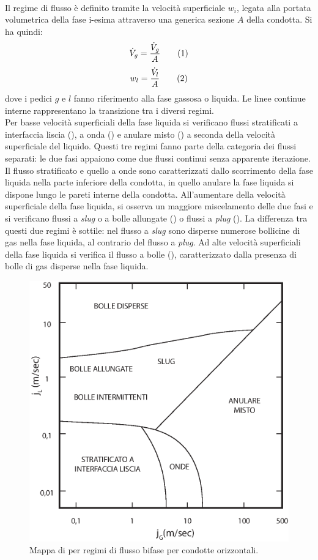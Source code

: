 \paragraph{\textcite{griffith1984multiphase}}
Il regime di flusso è definito tramite la velocità superficiale \(w_i\), legata alla portata volumetrica della fase i-esima attraverso una generica sezione \(A\) della condotta. Si ha quindi:
\[\dot{V}_g = \frac{\dot{V}_g}{A} \addtag\]
\[w_l = \frac{\dot{V}_l}{A} \addtag\]
dove i pedici \(g\) e \(l\) fanno riferimento alla fase gassosa o liquida. Le linee continue interne rappresentano la transizione tra i diversi regimi.\\
Per basse velocità superficiali della fase liquida si verificano flussi stratificati a interfaccia liscia (), a onda () e anulare misto () a seconda della velocità superficiale del liquido. Questi tre regimi fanno parte della categoria dei flussi separati: le due fasi appaiono come due flussi continui senza apparente iterazione. Il flusso stratificato e quello a onde sono caratterizzati dallo scorrimento della fase liquida nella parte inferiore della condotta, in quello anulare la fase liquida si dispone lungo le pareti interne della condotta. All'aumentare della velocità superficiale della fase liquida, si osserva un maggiore miscelamento delle due fasi e si verificano flussi a \textit{slug} o a bolle allungate () o flussi a \textit{plug} (). La differenza tra questi due regimi è sottile: nel flusso a \textit{slug} sono disperse numerose bollicine di gas nella fase liquida, al contrario del flusso a \textit{plug}. Ad alte velocità superficiali della fase liquida si verifica il flusso a bolle (), caratterizzato dalla presenza di bolle di gas disperse nella fase liquida.
\begin{figure}[htbp]
    \centering
    \includegraphics[width=.6\textwidth]{fig/fluidodinamica/hor-griffith.eps}
    \caption{Mappa di \textcite{griffith1984multiphase} per regimi di flusso bifase per condotte orizzontali.}
    \label{fig:hor-griffith}
\end{figure}

